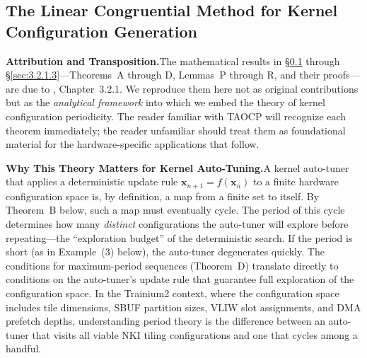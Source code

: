\documentclass[12pt]{article}
\begin{document}
\subsection{The Linear Congruential Method for Kernel Configuration Generation}
\label{sec:3.2.1}

\medskip
\noindent\textbf{Attribution and Transposition.}\quad The mathematical results in \S\ref{sec:3.2.1} through \S\ref{sec:3.2.1.3}---Theorems~A through D, Lemmas~P through R, and their proofs---are due to \citet{knuth1997taocp2}, Chapter~3.2.1. We reproduce them here not as original contributions but as the \emph{analytical framework} into which we embed the theory of kernel configuration periodicity. The reader familiar with TAOCP will recognize each theorem immediately; the reader unfamiliar should treat them as foundational material for the hardware-specific applications that follow.

\smallskip
\noindent\textbf{Why This Theory Matters for Kernel Auto-Tuning.}\quad A kernel auto-tuner that applies a deterministic update rule $\mathbf{x}_{n+1} = f(\mathbf{x}_n)$ to a finite hardware configuration space is, by definition, a map from a finite set to itself. By Theorem~B below, such a map must eventually cycle. The period of this cycle determines how many \emph{distinct} configurations the auto-tuner will explore before repeating---the ``exploration budget'' of the deterministic search. If the period is short (as in Example~(3) below), the auto-tuner degenerates quickly. The conditions for maximum-period sequences (Theorem~D) translate directly to conditions on the auto-tuner's update rule that guarantee full exploration of the configuration space. In the Trainium2 context, where the configuration space includes tile dimensions, SBUF partition sizes, VLIW slot assignments, and DMA prefetch depths, understanding period theory is the difference between an auto-tuner that visits all viable NKI tiling configurations and one that cycles among a handful.
\end{document}
